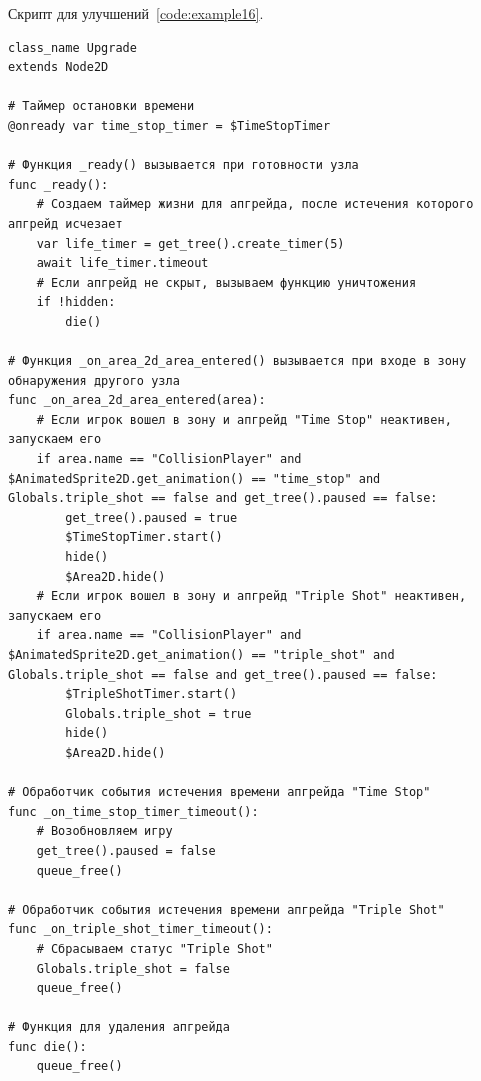 \label{{subsec:ch02/sec01/sub17}Подраздел 17. Скрипт для улучшений}
Скрипт для улучшений~\ref{code:example16}.
\begin{code}
\vspace{-\baselineskip}\begin{verbatim}
class_name Upgrade
extends Node2D

# Таймер остановки времени
@onready var time_stop_timer = $TimeStopTimer

# Функция _ready() вызывается при готовности узла
func _ready():
    # Создаем таймер жизни для апгрейда, после истечения которого апгрейд исчезает
    var life_timer = get_tree().create_timer(5)
    await life_timer.timeout
    # Если апгрейд не скрыт, вызываем функцию уничтожения
    if !hidden:
        die()

# Функция _on_area_2d_area_entered() вызывается при входе в зону обнаружения другого узла
func _on_area_2d_area_entered(area):
    # Если игрок вошел в зону и апгрейд "Time Stop" неактивен, запускаем его
    if area.name == "CollisionPlayer" and $AnimatedSprite2D.get_animation() == "time_stop" and Globals.triple_shot == false and get_tree().paused == false:
        get_tree().paused = true
        $TimeStopTimer.start()
        hide()
        $Area2D.hide()
    # Если игрок вошел в зону и апгрейд "Triple Shot" неактивен, запускаем его
    if area.name == "CollisionPlayer" and $AnimatedSprite2D.get_animation() == "triple_shot" and Globals.triple_shot == false and get_tree().paused == false:
        $TripleShotTimer.start()
        Globals.triple_shot = true
        hide()
        $Area2D.hide()

# Обработчик события истечения времени апгрейда "Time Stop"
func _on_time_stop_timer_timeout():
    # Возобновляем игру
    get_tree().paused = false
    queue_free()

# Обработчик события истечения времени апгрейда "Triple Shot"
func _on_triple_shot_timer_timeout():
    # Сбрасываем статус "Triple Shot"
    Globals.triple_shot = false
    queue_free()

# Функция для удаления апгрейда
func die():
    queue_free()

\end{verbatim}
\end{code}

